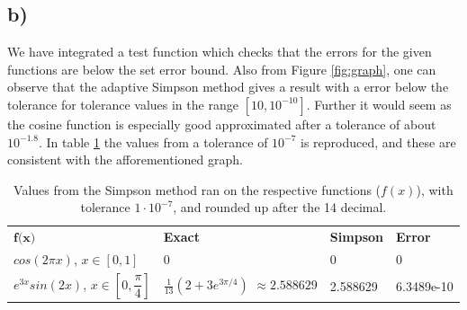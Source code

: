 \documentclass[12pt, a4paper,usenames,dvipsnames]{article}
\begin{document}
\thispagestyle{noheader}
\label{fig:graph}

\subsection*{b)}
We have integrated a test function which checks that the errors for the given functions are below the set error bound. Also from Figure \ref{fig:graph}, one can observe that the adaptive Simpson method gives a result with a error below the tolerance for tolerance values in the range \([10,10^{-10}]\). Further it would seem as the cosine function is especially good approximated after a tolerance of about \(10^{-1.8}\). In table \ref{tab:simps} the values from a tolerance of \(10^{-7}\) is reproduced, and these are consistent with the afforementioned graph.
\begin{table}[h]
\centering
\begin{tabular}{p{2cm}p{2.5cm}ll}

\rowcolor{XKCDpale}$\textbf{f(x)}$                     & \textbf{Exact}               & \textbf{Simpson} & \textbf{Error} \\ \rowcolor{tableBack}
$cos(2 \pi x)$, \newline$x \in [0, 1]$      & 0                            & 0          & 0       \\ \rowcolor{tableBack}
$e^{3x}sin(2x)$, \newline$x \in [0, \dfrac{\pi}{4}]$ & $\frac{1}{13}(2+3e^{3\pi/4})$ \newline$\approx 2.588629$& 2.588629          & 6.3489e-10       \\ 
\end{tabular}
\caption{Values from the Simpson method ran on the respective functions ($f(x)$), with tolerance $1\cdot10^{-7}$, and rounded up after the 14 decimal.}
\label{tab:simps}
\end{table}
\restoregeometry
\end{document}
